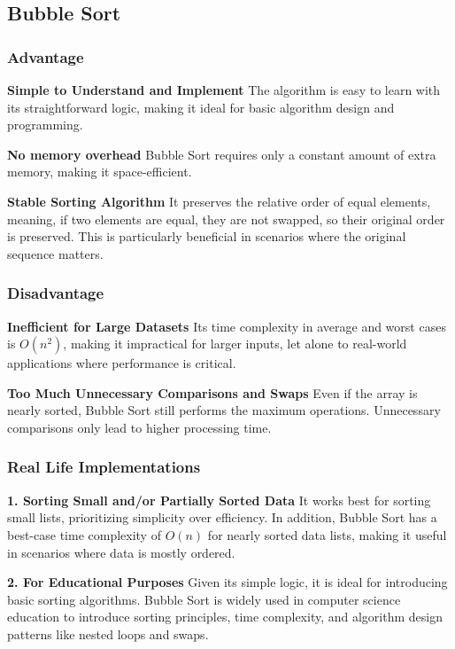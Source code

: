 \subsection{Bubble Sort}

\subsubsection{Advantage}
\textbf{Simple to Understand and Implement} 
The algorithm is easy to learn with its straightforward logic, making it ideal for basic algorithm design and programming. 

\textbf{No memory overhead} 
Bubble Sort requires only a constant amount of extra memory, making it space-efficient. 

\textbf{Stable Sorting Algorithm} 
It preserves the relative order of equal elements, meaning, if two elements are equal, they are not swapped, so their original order is preserved. This is particularly beneficial in scenarios where the original sequence matters. 

\subsubsection{Disadvantage}
\textbf{Inefficient for Large Datasets} 
Its time complexity in average and worst cases is $O(n^2)$, making it impractical for larger inputs, let alone to real-world applications where performance is critical. 

\textbf{Too Much Unnecessary Comparisons and Swaps} 
Even if the array is nearly sorted, Bubble Sort still performs the maximum operations. Unnecessary comparisons only lead to higher processing time. 

\subsubsection{Real Life Implementations}

\textbf{1. Sorting Small and/or Partially Sorted Data }
   It works best for sorting small lists, prioritizing simplicity over efficiency. In addition, Bubble Sort has a best-case time complexity of $O(n)$ for nearly sorted data lists, making it useful in scenarios where data is mostly ordered. 

\textbf{2. For Educational Purposes }
   Given its simple logic, it is ideal for introducing basic sorting algorithms. Bubble Sort is widely used in computer science education to introduce sorting principles, time complexity, and algorithm design patterns like nested loops and swaps. 

